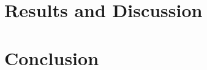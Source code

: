 \documentclass[a4paper, 12pt, oneside]{article}
\theoremstyle{alten}
\begin{document}
\clearpage
\section{Results and Discussion}
\label{sec:Results}


\clearpage
\section{Conclusion}
\label{sec:Conclusion}


\clearpage
\printbibliography[heading=bibintoc, title={References}]

\clearpage
\appendix









\end{document}
